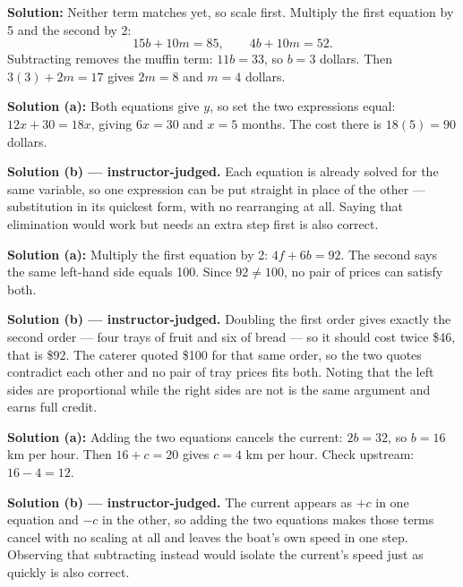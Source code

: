 \documentclass[12pt]{article}
\begin{document}

\textbf{Solution:} Neither term matches yet, so scale first. Multiply the
first equation by 5 and the second by 2:
\[
  15b + 10m = 85, \qquad 4b + 10m = 52 .
\]
Subtracting removes the muffin term: $11b = 33$, so $b = 3$ dollars. Then
$3(3) + 2m = 17$ gives $2m = 8$ and $m = 4$ dollars. 


\textbf{Solution (a):} Both equations give $y$, so set the two expressions
equal: $12x + 30 = 18x$, giving $6x = 30$ and $x = 5$ months. The cost there
is $18(5) = 90$ dollars. 

\textbf{Solution (b) --- instructor-judged.} Each equation is already solved
for the same variable, so one expression can be put straight in place of the
other --- substitution in its quickest form, with no rearranging at all.
Saying that elimination would work but needs an extra step first is also
correct.


\textbf{Solution (a):} Multiply the first equation by 2: $4f + 6b = 92$. The
second says the same left-hand side equals 100. Since $92 \neq 100$, no pair
of prices can satisfy both. 

\textbf{Solution (b) --- instructor-judged.} Doubling the first order gives
exactly the second order --- four trays of fruit and six of bread --- so it
should cost twice \$46, that is \$92. The caterer quoted \$100 for that same
order, so the two quotes contradict each other and no pair of tray prices fits
both. Noting that the left sides are proportional while the right sides are
not is the same argument and earns full credit.


\textbf{Solution (a):} Adding the two equations cancels the current:
$2b = 32$, so $b = 16$ km per hour. Then $16 + c = 20$ gives $c = 4$ km per
hour. Check upstream: $16 - 4 = 12$. 

\textbf{Solution (b) --- instructor-judged.} The current appears as $+c$ in
one equation and $-c$ in the other, so adding the two equations makes those
terms cancel with no scaling at all and leaves the boat's own speed in one
step. Observing that subtracting instead would isolate the current's speed
just as quickly is also correct.
\end{document}
